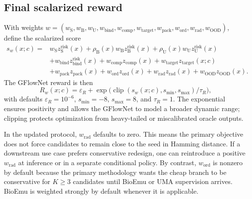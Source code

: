 \documentclass[11pt]{article}
\begin{document}
\subsection{Final scalarized reward}

With weights $w=(w_{\mathrm S},w_{\mathrm B},w_{\mathrm U},w_{\mathrm{bind}},w_{\mathrm{comp}},w_{\mathrm{target}},w_{\mathrm{pack}},w_{\mathrm{ord}},w_{\mathrm{rad}},w_{\mathrm{OOD}})$, define the scalarized score
\begin{equation}
\label{eq:score}
\begin{aligned}
    s_w(x;c)={}&w_{\mathrm S}z_{\mathrm S}^{\mathrm{risk}}(x)+\rho_{\mathrm B}(x)w_{\mathrm B}z_{\mathrm B}^{\mathrm{risk}}(x)+\rho_{\mathrm U}(x)w_{\mathrm U}z_{\mathrm U}^{\mathrm{risk}}(x)\\
    &+w_{\mathrm{bind}}z_{\mathrm{bind}}^{\mathrm{risk}}(x)+w_{\mathrm{comp}}z_{\mathrm{comp}}(x)+w_{\mathrm{target}}z_{\mathrm{target}}(x;c)\\
    &+w_{\mathrm{pack}}z_{\mathrm{pack}}(x)+w_{\mathrm{ord}}z_{\mathrm{ord}}(x)+w_{\mathrm{rad}}z_{\mathrm{rad}}(x)+w_{\mathrm{OOD}}z_{\mathrm{OOD}}(x).
\end{aligned}
\end{equation}
The GFlowNet reward is then
\begin{equation}
\label{eq:reward}
    R_w(x;c)=\varepsilon_R + \exp\Big(\operatorname{clip}(s_w(x;c), s_{\min}, s_{\max})/\tau_R\Big),
\end{equation}
with defaults $\varepsilon_R=10^{-6}$, $s_{\min}=-8$, $s_{\max}=8$, and $\tau_R=1$. The exponential ensures positivity and allows the GFlowNet to model a broader dynamic range; clipping protects optimization from heavy-tailed or miscalibrated oracle outputs.

In the updated protocol, $w_{\mathrm{rad}}$ defaults to zero. This means the primary objective does not force candidates to remain close to the seed in Hamming distance. If a downstream use case prefers conservative redesign, one can reintroduce a positive $w_{\mathrm{rad}}$ at inference or in a separate conditional policy. By contrast, $w_{\mathrm{ord}}$ is nonzero by default because the primary methodology wants the cheap branch to be conservative for $K\ge 3$ candidates until BioEmu or UMA supervision arrives. BioEmu is weighted strongly by default whenever it is applicable.
\end{document}
